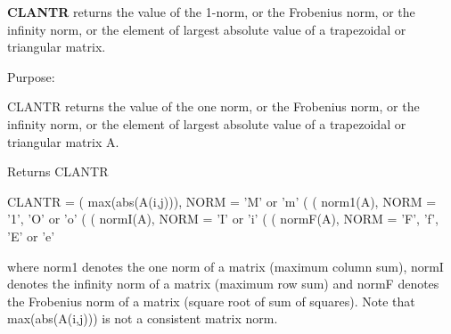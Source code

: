 {\bfseries C\+L\+A\+N\+T\+R} returns the value of the 1-\/norm, or the Frobenius norm, or the infinity norm, or the element of largest absolute value of a trapezoidal or triangular matrix. 

 \begin{DoxyParagraph}{Purpose\+: }
\begin{DoxyVerb} CLANTR  returns the value of the one norm,  or the Frobenius norm, or
 the  infinity norm,  or the  element of  largest absolute value  of a
 trapezoidal or triangular matrix A.\end{DoxyVerb}

\end{DoxyParagraph}
\begin{DoxyReturn}{Returns}
C\+L\+A\+N\+T\+R \begin{DoxyVerb}    CLANTR = ( max(abs(A(i,j))), NORM = 'M' or 'm'
             (
             ( norm1(A),         NORM = '1', 'O' or 'o'
             (
             ( normI(A),         NORM = 'I' or 'i'
             (
             ( normF(A),         NORM = 'F', 'f', 'E' or 'e'

 where  norm1  denotes the  one norm of a matrix (maximum column sum),
 normI  denotes the  infinity norm  of a matrix  (maximum row sum) and
 normF  denotes the  Frobenius norm of a matrix (square root of sum of
 squares).  Note that  max(abs(A(i,j)))  is not a consistent matrix norm.\end{DoxyVerb}
 
\end{DoxyReturn}

